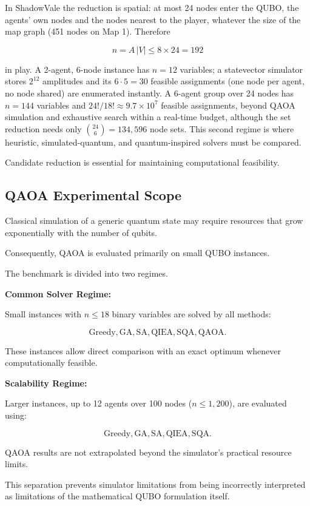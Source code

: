 \documentclass[12pt, a4paper]{article}
\begin{document}
In ShadowVale the reduction is spatial: at most 24 nodes enter the QUBO, the agents' own nodes and the nodes nearest to the player, whatever the size of the map graph (451 nodes on Map 1). Therefore

$$
n = A\,|V| \le 8 \times 24 = 192
$$

in play. A 2-agent, 6-node instance has $n=12$ variables; a statevector simulator stores $2^{12}$ amplitudes and its $6\cdot5=30$ feasible assignments (one node per agent, no node shared) are enumerated instantly. A 6-agent group over 24 nodes has $n=144$ variables and $24!/18! \approx 9.7 \times 10^{7}$ feasible assignments, beyond QAOA simulation and exhaustive search within a real-time budget, although the set reduction needs only $\binom{24}{6}=134{,}596$ node sets. This second regime is where heuristic, simulated-quantum, and quantum-inspired solvers must be compared.

Candidate reduction is essential for maintaining computational feasibility.

\subsection*{QAOA Experimental Scope}

Classical simulation of a generic quantum state may require resources that grow exponentially with the number of qubits.

Consequently, QAOA is evaluated primarily on small QUBO instances.

The benchmark is divided into two regimes.

\textbf{Common Solver Regime:}

Small instances with $n \le 18$ binary variables are solved by all methods:

$$
\text{Greedy},
\text{GA},
\text{SA},
\text{QIEA},
\text{SQA},
\text{QAOA}.
$$

These instances allow direct comparison with an exact optimum whenever computationally feasible.

\textbf{Scalability Regime:}

Larger instances, up to 12 agents over 100 nodes ($n \le 1{,}200$), are evaluated using:

$$
\text{Greedy},
\text{GA},
\text{SA},
\text{QIEA},
\text{SQA}.
$$

QAOA results are not extrapolated beyond the simulator's practical resource limits.

This separation prevents simulator limitations from being incorrectly interpreted as limitations of the mathematical QUBO formulation itself.
\end{document}
